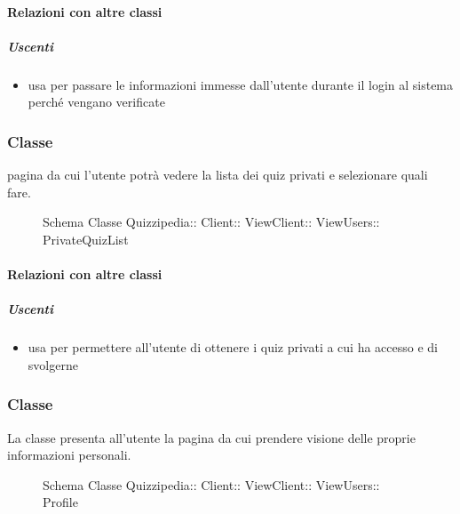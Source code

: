 \paragraph{Relazioni con altre classi}
\subparagraph{Uscenti}
\begin{itemize}
\item usa  per passare le informazioni immesse dall'utente durante il login al sistema perché vengano verificate
\end{itemize}
\subsubsection{Classe }
pagina da cui l'utente potrà vedere la lista dei quiz privati e selezionare quali fare.
\begin{figure}[H]
\centering
\noindent{}
\caption[Schema Classe PrivateQuizList]{Schema Classe Quizzipedia:: Client:: ViewClient:: ViewUsers:: PrivateQuizList}
\end{figure}
\paragraph{Relazioni con altre classi}
\subparagraph{Uscenti}
\begin{itemize}
\item usa  per permettere all'utente di ottenere i quiz privati a cui ha accesso e di svolgerne
\end{itemize}
\subsubsection{Classe }
La classe presenta all'utente la pagina da cui prendere visione delle proprie informazioni personali.
\begin{figure}[H]
\centering
\noindent{}
\caption[Schema Classe Profile]{Schema Classe Quizzipedia:: Client:: ViewClient:: ViewUsers:: Profile}
\end{figure}
